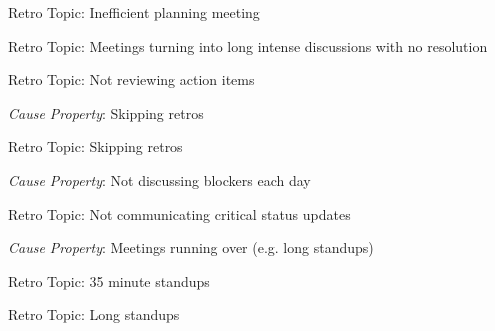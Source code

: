 \quad \quad \quad Retro Topic: Inefficient planning meeting

\quad \quad \quad Retro Topic: Meetings turning into long intense discussions with no resolution

\quad \quad \quad Retro Topic: Not reviewing action items

\quad \quad \textit{Cause Property}: Skipping retros

\quad \quad \quad Retro Topic: Skipping retros

\quad \quad \textit{Cause Property}: Not discussing blockers each day

\quad \quad \quad Retro Topic: Not communicating critical status updates

\quad \quad \textit{Cause Property}: Meetings running over (e.g. long standups)

\quad \quad \quad Retro Topic: 35 minute standups

\quad \quad \quad Retro Topic: Long standups

